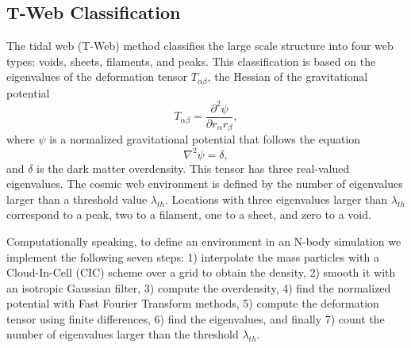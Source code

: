 \documentclass[usenatbib]{mnras}
\begin{document}
\subsection{T-Web Classification}

The tidal web (T-Web) method \citep{Hahn2007, Forero-Romero2009}
classifies the large scale structure into four web types: voids,
sheets, filaments, and peaks.   
This classification is based on the eigenvalues of the deformation
tensor $T_{\alpha\beta}$, the Hessian of the gravitational potential 
\begin{equation}
T_{\alpha\beta}=\frac{\partial^2\psi}{\partial r_{\alpha}r_{\beta}},
\end{equation}
%
where $\psi$ is a normalized gravitational potential that follows the equation
\begin{equation}
    \nabla^2 \psi = \delta,
\end{equation}
%
and $\delta$ is the dark matter overdensity.
This tensor has three real-valued eigenvalues. 
The cosmic web environment is defined by the number of eigenvalues
larger than a threshold value $\lambda_{th}$.
Locations with three eigenvalues larger than $\lambda_{th}$ correspond
to a peak, two to a filament, one to a sheet, and zero to a void.

Computationally speaking, to define an environment in an N-body
simulation we implement the following seven steps: 1) interpolate the
mass particles with a Cloud-In-Cell  (CIC) scheme over a grid to
obtain the density, 2) smooth it with an isotropic Gaussian filter,
3) compute the overdensity, 4) find the normalized potential with Fast
Fourier Transform  methods, 5) compute the deformation tensor using
finite differences, 6) find the eigenvalues, and finally 7) count the
number of eigenvalues larger than the threshold $\lambda_{th}$.  
\end{document}
